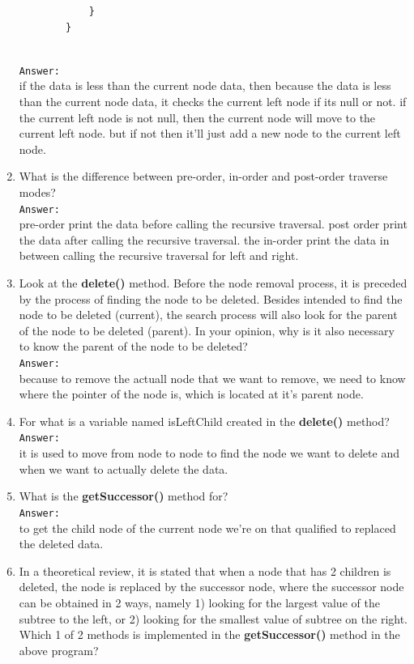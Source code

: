 \documentclass[12pt,titlepage]{article}
\begin{document}
\begin{enumerate}
\begin{verbatim}
            }
        }
    \end{verbatim}
    \mbox{}\\ \texttt{Answer:} \mbox{}\\
    if the data is less than the current node data, then because the data is less than the current node data, it checks the current left node if its null or not. if the current left node is not null, then the current node will move to the current left node. but if not then it'll just add a new node to the current left node.
    \item What is the difference between pre-order, in-order and post-order traverse modes?
    \mbox{}\\ \texttt{Answer:} \mbox{}\\
    pre-order print the data before calling the recursive traversal. post order print the data after calling the recursive traversal. the in-order print the data in between calling the recursive traversal for left and right. 
    \item Look at the \textbf{delete()} method. Before the node removal process, it is preceded by the process of finding the node to be deleted. Besides intended to find the node to be deleted (current), the search process will also look for the parent of the node to be deleted (parent). In your opinion, why is it also necessary to know the parent of the node to be deleted?
    \mbox{}\\ \texttt{Answer:} \mbox{}\\
    because to remove the actuall node that we want to remove, we need to know where the pointer of the node is, which is located at it's parent node.
    \item For what is a variable named isLeftChild created in the \textbf{delete()} method?
    \mbox{}\\ \texttt{Answer:} \mbox{}\\
    it is used to move from node to node to find the node we want to delete and when we want to actually delete the data. 
    \item What is the \textbf{getSuccessor()} method for?
    \mbox{}\\ \texttt{Answer:} \mbox{}\\
    to get the child node of the current node we're on that qualified to replaced the deleted data.
    \item In a theoretical review, it is stated that when a node that has 2 children is deleted, the node is replaced by the successor node, where the successor node can be obtained in 2 ways, namely 1) looking for the largest value of the subtree to the left, or 2) looking for the smallest value of subtree on the right. Which 1 of 2 methods is implemented in the \textbf{getSuccessor()} method in the above program?

\end{enumerate}
\end{document}
